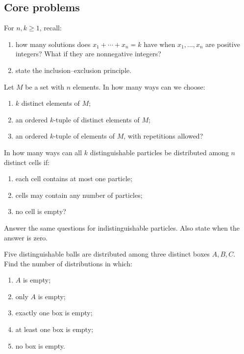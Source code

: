 \documentclass[11pt,a4paper]{article}
\newenvironment{enumeratea}{\begin{enumerate}[label=(\alph*),itemsep=0.28em,topsep=0.25em]}{\end{enumerate}}
\newcounter{problem}[section]
\begin{document}
\subsection*{Core problems}
\begin{problembook}
For $n,k\ge 1$, recall:
\begin{enumeratea}
  \item how many solutions does $x_1+\cdots+x_n=k$ have when $x_1,\dots,x_n$
  are positive integers? What if they are nonnegative integers?
  \item state the inclusion--exclusion principle.
\end{enumeratea}
\end{problembook}
\begin{problembook}
Let $M$ be a set with $n$ elements. In how many ways can we choose:
\begin{enumeratea}
  \item $k$ distinct elements of $M$;
  \item an ordered $k$-tuple of distinct elements of $M$;
  \item an ordered $k$-tuple of elements of $M$, with repetitions allowed?
\end{enumeratea}
\end{problembook}
\begin{problem}
In how many ways can all $k$ distinguishable particles be distributed among $n$
distinct cells if:
\begin{enumeratea}
  \item each cell contains at most one particle;
  \item cells may contain any number of particles;
  \item no cell is empty?
\end{enumeratea}
Answer the same questions for indistinguishable particles. Also state when the answer is zero.
\end{problem}
\begin{problem}
Five distinguishable balls are distributed among three distinct boxes $A,B,C$.
Find the number of distributions in which:
\begin{enumeratea}
  \item $A$ is empty;
  \item only $A$ is empty;
  \item exactly one box is empty;
  \item at least one box is empty;
  \item no box is empty.
\end{enumeratea}
\end{problem}
\end{document}
